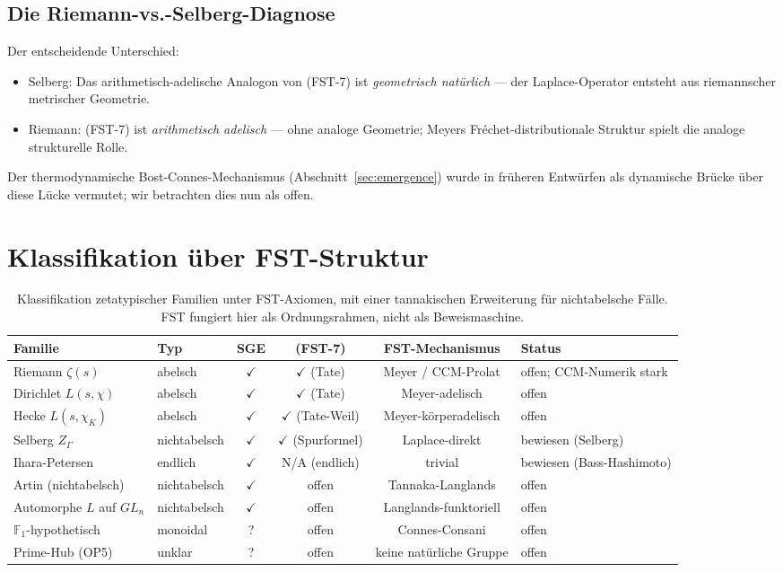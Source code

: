 \documentclass[11pt,a4paper]{article}
\theoremstyle{plain}
\theoremstyle{definition}
\newcommand{\F}{\mathbb{F}}
\newcommand{\chifn}{\chi}
\begin{document}
\subsection{Die Riemann-vs.-Selberg-Diagnose}

Der entscheidende Unterschied:
\begin{itemize}
\item Selberg: Das arithmetisch-adelische Analogon von (FST-7) ist
  \emph{geometrisch natürlich} --- der Laplace-Operator entsteht aus
  riemannscher metrischer Geometrie.
\item Riemann: (FST-7) ist \emph{arithmetisch adelisch} --- ohne analoge
  Geometrie; Meyers Fréchet-distributionale Struktur spielt die analoge
  strukturelle Rolle.
\end{itemize}

Der thermodynamische Bost-Connes-Mechanismus (Abschnitt~\ref{sec:emergence})
wurde in früheren Entwürfen als dynamische Brücke über diese Lücke
vermutet; wir betrachten dies nun als offen.

\section{Klassifikation über FST-Struktur}
\label{sec:classification}

\begin{table}[h]
\centering
\small
\begin{tabular}{@{}llcccl@{}}
\toprule
\textbf{Familie} & \textbf{Typ} & \textbf{SGE} & \textbf{(FST-7)} & \textbf{FST-Mechanismus} & \textbf{Status} \\
\midrule
Riemann $\zeta(s)$ & abelsch & $\checkmark$ & $\checkmark$ (Tate) & Meyer / CCM-Prolat & offen; CCM-Numerik stark \\
Dirichlet $L(s, \chifn)$ & abelsch & $\checkmark$ & $\checkmark$ (Tate) & Meyer-adelisch & offen \\
Hecke $L(s, \chifn_K)$ & abelsch & $\checkmark$ & $\checkmark$ (Tate-Weil) & Meyer-körperadelisch & offen \\
Selberg $Z_\Gamma$ & nichtabelsch & $\checkmark$ & $\checkmark$ (Spurformel) & Laplace-direkt & bewiesen (Selberg) \\
Ihara-Petersen & endlich & $\checkmark$ & N/A (endlich) & trivial & bewiesen (Bass-Hashimoto) \\
Artin (nichtabelsch) & nichtabelsch & $\checkmark$ & offen & Tannaka-Langlands & offen \\
Automorphe $L$ auf $GL_n$ & nichtabelsch & $\checkmark$ & offen & Langlands-funktoriell & offen \\
$\F_1$-hypothetisch & monoidal & ? & offen & Connes-Consani & offen \\
Prime-Hub (OP5) & unklar & ? & offen & keine natürliche Gruppe & offen \\
\bottomrule
\end{tabular}
\caption{Klassifikation zetatypischer Familien unter FST-Axiomen,
mit einer tannakischen Erweiterung für nichtabelsche Fälle. FST fungiert
hier als Ordnungsrahmen, nicht als Beweismaschine.}
\label{tab:classification-v2}
\end{table}
\end{document}
